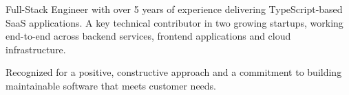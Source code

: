 \documentclass[8pt]{developercv} %
\begin{document}
\vspace{0.5cm}



\begin{minipage}[t]{0.4\textwidth} %
	\vspace{-\baselineskip} %
	
Full-Stack Engineer with over 5 years of experience delivering TypeScript-based SaaS applications.
A key technical contributor in two growing startups, working end-to-end across backend services,
frontend applications and cloud infrastructure.

Recognized for a positive, constructive approach and a commitment to building maintainable software that meets customer needs.

\end{minipage}
\hfill %
\begin{minipage}[t]{0.5\textwidth} %
	\vspace{-\baselineskip} %
	\begin{barchart}{5.5}
	\end{barchart}
\end{minipage}



\end{document}
